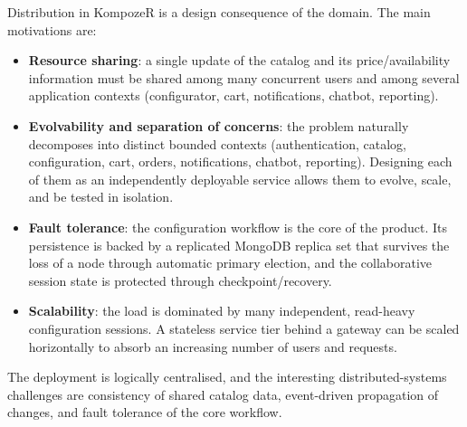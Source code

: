 Distribution in KompozeR is a design consequence of the domain. The main motivations are:

\begin{itemize}
  \item \textbf{Resource sharing}: a single update of the catalog and its
  price/availability information must be shared among many concurrent users and
  among several application contexts (configurator, cart, notifications,
  chatbot, reporting).

  \item \textbf{Evolvability and separation of concerns}: the problem naturally
  decomposes into distinct bounded contexts (authentication, catalog,
  configuration, cart, orders, notifications, chatbot, reporting). Designing
  each of them as an independently deployable service allows them to evolve, scale, and
  be tested in isolation.

  \item \textbf{Fault tolerance}: the configuration workflow is the core of the
  product. Its persistence is backed by a replicated MongoDB replica set that
  survives the loss of a node through automatic primary election, and the
  collaborative session state is protected through checkpoint/recovery.

  \item \textbf{Scalability}: the load is dominated by many independent,
  read-heavy configuration sessions. A stateless service tier behind a gateway
  can be scaled horizontally to absorb an increasing number of users and
  requests.
\end{itemize}

The deployment is logically centralised, and the interesting
distributed-systems challenges are consistency of shared catalog data,
event-driven propagation of changes, and fault tolerance of the core workflow.
